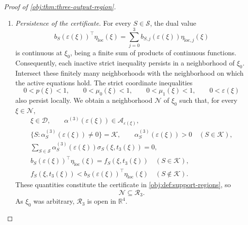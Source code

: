 \begin{proof}[Proof of \cref{obj:thm:three-output-region}]
\begin{enumerate}
\[\begin{aligned}
(\mathsf A_3(\xi)\mathsf R_0)^{-1}
\bigl(\boldsymbol f_3(\xi)-\mathsf A_3(\xi)\eta^{(0)}\bigr)\\
&=\boldsymbol f_3(\xi).
\end{aligned}
\]
Thus the three active dual equalities hold locally, and the original inactive strict inequalities hold at the base point:
\[
f_S(\xi_0,t_3(\xi_0))
<
b_S(\varepsilon(\xi_0))^\top\eta_{\mathrm{loc}}(\xi_0)
\quad(S\notin\mathcal K).
\]

\item \textit{Persistence of the certificate.}
For every \(S\in\mathcal S\), the dual value
\[
b_S(\varepsilon(\xi))^\top\eta_{\mathrm{loc}}(\xi)
=
\sum_{j=0}^3b_{S,j}(\varepsilon(\xi))
\eta_{\mathrm{loc},j}(\xi)
\]
is continuous at \(\xi_0\), being a finite sum of products of continuous functions. Consequently, each inactive strict inequality persists in a neighborhood of \(\xi_0\). Intersect these finitely many neighborhoods with the neighborhood on which the active equations hold. The strict coordinate inequalities
\[
0<p(\xi)<1,\qquad
0<\mu_0(\xi)<1,\qquad
0<\mu_1(\xi)<1,\qquad
0<\varepsilon(\xi)
\]
also persist locally. We obtain a neighborhood \(\mathcal N\) of \(\xi_0\) such that, for every \(\xi\in\mathcal N\),
\[
\begin{gathered}
\xi\in\mathcal D,\qquad
\alpha^{(3)}(\varepsilon(\xi))\in\mathcal A_{\varepsilon(\xi)},\\
\{S:\alpha^{(3)}_S(\varepsilon(\xi))\ne0\}=\mathcal K,
\qquad
\alpha^{(3)}_S(\varepsilon(\xi))>0\quad(S\in\mathcal K),\\
\sum_{S\in\mathcal S}
\alpha^{(3)}_S(\varepsilon(\xi))\sigma_S(\xi,t_3(\xi))=0,\\
b_S(\varepsilon(\xi))^\top\eta_{\mathrm{loc}}(\xi)
=f_S(\xi,t_3(\xi))
\quad(S\in\mathcal K),\\
f_S(\xi,t_3(\xi))
<
b_S(\varepsilon(\xi))^\top\eta_{\mathrm{loc}}(\xi)
\quad(S\notin\mathcal K).
\end{gathered}
\]
These quantities constitute the certificate in \cref{obj:def:support-regions}, so
\[
\mathcal N\subseteq\mathcal R_3.
\]
As \(\xi_0\) was arbitrary, \(\mathcal R_3\) is open in \(\mathbb R^4\).


\end{enumerate}
\end{proof}
